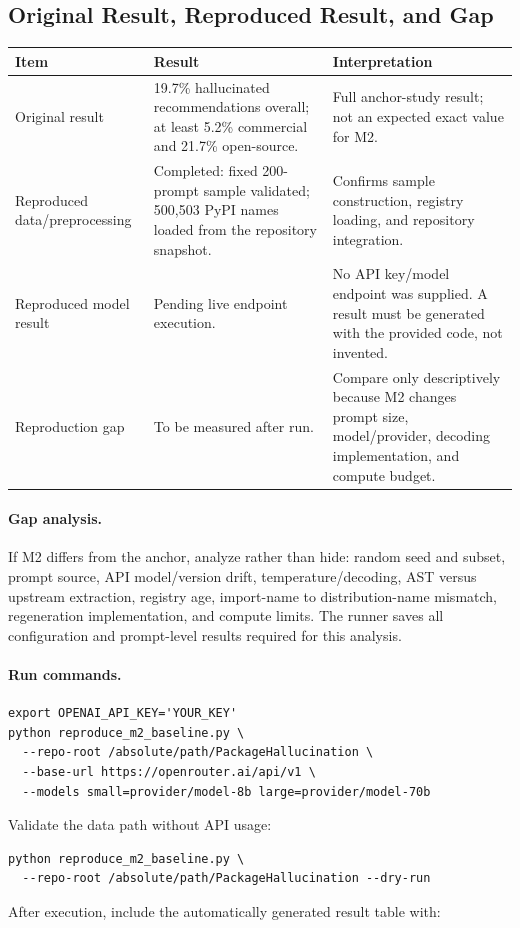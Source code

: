 \documentclass[11pt,a4paper]{article}
\begin{document}
\subsection{Original Result, Reproduced Result, and Gap}
\small
\begin{tabularx}{\linewidth}{p{3.0cm}p{4.1cm}X}
\toprule
\textbf{Item} & \textbf{Result} & \textbf{Interpretation}\\
\midrule
Original result & 19.7\% hallucinated recommendations overall; at least 5.2\% commercial and 21.7\% open-source. & Full anchor-study result; not an expected exact value for M2.\\
Reproduced data/preprocessing & Completed: fixed 200-prompt sample validated; 500,503 PyPI names loaded from the repository snapshot. & Confirms sample construction, registry loading, and repository integration.\\
Reproduced model result & Pending live endpoint execution. & No API key/model endpoint was supplied. A result must be generated with the provided code, not invented.\\
Reproduction gap & To be measured after run. & Compare only descriptively because M2 changes prompt size, model/provider, decoding implementation, and compute budget.\\
\bottomrule
\end{tabularx}
\normalsize

\paragraph{Gap analysis.}
If M2 differs from the anchor, analyze rather than hide: random seed and subset, prompt source, API model/version drift, temperature/decoding, AST versus upstream extraction, registry age, import-name to distribution-name mismatch, regeneration implementation, and compute limits. The runner saves all configuration and prompt-level results required for this analysis.

\paragraph{Run commands.}
\begin{verbatim}
export OPENAI_API_KEY='YOUR_KEY'
python reproduce_m2_baseline.py \
  --repo-root /absolute/path/PackageHallucination \
  --base-url https://openrouter.ai/api/v1 \
  --models small=provider/model-8b large=provider/model-70b
\end{verbatim}
Validate the data path without API usage:
\begin{verbatim}
python reproduce_m2_baseline.py \
  --repo-root /absolute/path/PackageHallucination --dry-run
\end{verbatim}
After execution, include the automatically generated result table with:
\begin{verbatim}

\end{verbatim}
\end{document}
